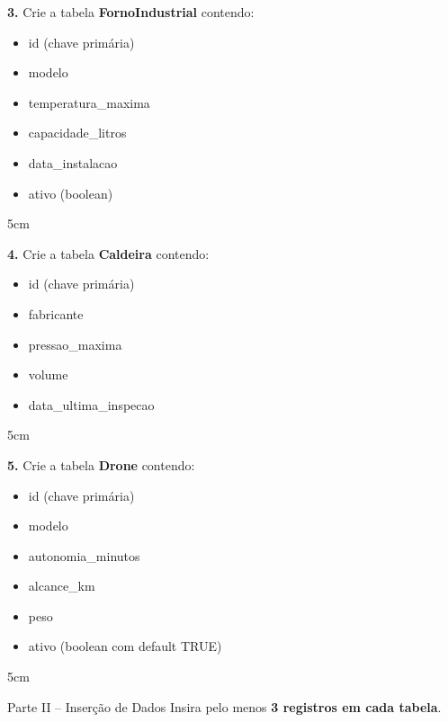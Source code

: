 \documentclass[12pt]{article}
\begin{document}
\vspace{0.5cm}

\textbf{3.} Crie a tabela \textbf{FornoIndustrial} contendo:
\begin{itemize}
    \item id (chave primária)
    \item modelo
    \item temperatura\_maxima
    \item capacidade\_litros
    \item data\_instalacao
    \item ativo (boolean)
\end{itemize}
\begin{resposta}{5cm}
\end{resposta}

\vspace{0.5cm}

\textbf{4.} Crie a tabela \textbf{Caldeira} contendo:
\begin{itemize}
    \item id (chave primária)
    \item fabricante
    \item pressao\_maxima
    \item volume
    \item data\_ultima\_inspecao
\end{itemize}
\begin{resposta}{5cm}
\end{resposta}

\vspace{0.5cm}

\textbf{5.} Crie a tabela \textbf{Drone} contendo:
\begin{itemize}
    \item id (chave primária)
    \item modelo
    \item autonomia\_minutos
    \item alcance\_km
    \item peso
    \item ativo (boolean com default TRUE)
\end{itemize}
\begin{resposta}{5cm}
\end{resposta}

\vspace{0.8cm}

\begin{block}{Parte II – Inserção de Dados}
Insira pelo menos \textbf{3 registros em cada tabela}.
\end{block}
\end{document}
